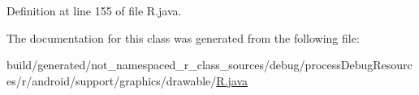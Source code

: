 Definition at line 155 of file R.\+java.



The documentation for this class was generated from the following file\+:\begin{DoxyCompactItemize}
\item 
build/generated/not\+\_\+namespaced\+\_\+r\+\_\+class\+\_\+sources/debug/process\+Debug\+Resources/r/android/support/graphics/drawable/\mbox{\hyperlink{android_2support_2graphics_2drawable_2_r_8java}{R.\+java}}\end{DoxyCompactItemize}
